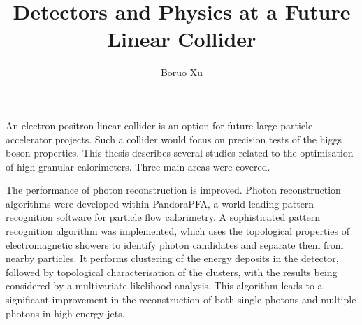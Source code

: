 \documentclass[11pt,tightenlines,print,twoside,onecolumn,aps,amsmath,amssymb]{revtex4}
\newcommand{\tstamp}{\today}
\begin{document}
\chead[\fancyplain{}{}]                 {\fancyplain{}{}}
\lfoot[\fancyplain{}{}]                 {\fancyplain{}{}}   %
\cfoot[\fancyplain{\thepage}{}]         {\fancyplain{\thepage}{}}
\rfoot[\fancyplain{}{}]  {\fancyplain{}{}}    %

\title{Detectors and Physics at a Future Linear Collider}
\author{Boruo Xu}

\begin{abstract}




\end{abstract}

\maketitle



An electron-positron linear collider is an option for future large particle accelerator projects. Such a collider would focus on precision tests of the higgs boson properties. This thesis describes several studies related to the optimisation of high granular calorimeters. Three main areas were covered.

The performance of photon reconstruction is improved. Photon reconstruction algorithms were developed within PandoraPFA, a world-leading pattern-recognition software for particle flow calorimetry. A sophisticated pattern recognition algorithm was implemented, which uses the topological properties of electromagnetic showers to identify photon candidates and separate them from nearby particles. It performs clustering of the energy deposits in the detector, followed by topological characterisation of the clusters, with the results being considered by a multivariate likelihood analysis. This algorithm leads to a significant improvement in the reconstruction of both single photons and multiple photons in high energy jets.
\end{document}

